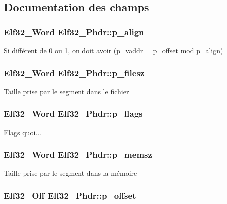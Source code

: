 \subsection{Documentation des champs}
\hypertarget{structElf32__Phdr_afd09d9e4297b13fc94fd57d09f2a9f70}{
\subsubsection[{p\-\_\-align}]{\setlength{\rightskip}{0pt plus 5cm}Elf32\-\_\-\-Word Elf32\-\_\-\-Phdr\-::p\-\_\-align}}\label{structElf32__Phdr_afd09d9e4297b13fc94fd57d09f2a9f70}
Si différent de 0 ou 1, on doit avoir (p\-\_\-vaddr = p\-\_\-offset mod p\-\_\-align) \hypertarget{structElf32__Phdr_ac9151f2e11001284bf1c7d2d2659555c}{
\subsubsection[{p\-\_\-filesz}]{\setlength{\rightskip}{0pt plus 5cm}Elf32\-\_\-\-Word Elf32\-\_\-\-Phdr\-::p\-\_\-filesz}}\label{structElf32__Phdr_ac9151f2e11001284bf1c7d2d2659555c}
Taille prise par le segment dans le fichier \hypertarget{structElf32__Phdr_a35c457e6828894b7b275730593802050}{
\subsubsection[{p\-\_\-flags}]{\setlength{\rightskip}{0pt plus 5cm}Elf32\-\_\-\-Word Elf32\-\_\-\-Phdr\-::p\-\_\-flags}}\label{structElf32__Phdr_a35c457e6828894b7b275730593802050}
Flags quoi... \hypertarget{structElf32__Phdr_ada1cdd3d6ccb79a17bed0e3c21379c84}{
\subsubsection[{p\-\_\-memsz}]{\setlength{\rightskip}{0pt plus 5cm}Elf32\-\_\-\-Word Elf32\-\_\-\-Phdr\-::p\-\_\-memsz}}\label{structElf32__Phdr_ada1cdd3d6ccb79a17bed0e3c21379c84}
Taille prise par le segment dans la mémoire \hypertarget{structElf32__Phdr_ac590d4c4b26104216e53058b5b03eef0}{
\subsubsection[{p\-\_\-offset}]{\setlength{\rightskip}{0pt plus 5cm}Elf32\-\_\-\-Off Elf32\-\_\-\-Phdr\-::p\-\_\-offset}}\label{structElf32__Phdr_ac590d4c4b26104216e53058b5b03eef0}
